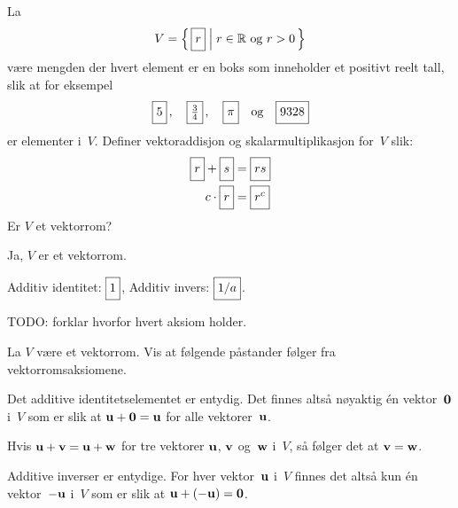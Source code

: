 \begin{oppgave}
La
\[
V = \left\{\, \boks{r} \;\middle|\; \text{$r \in \R$ og $r > 0$} \,\right\}
\]
være mengden der hvert element er en boks som inneholder et positivt reelt tall,
slik at for eksempel
\[
\boks{5}\,,\quad
\boks{\frac{3}{4}}\,,\quad
\boks{\pi}\quad\text{og}\quad
\boks{9328}
\]
er elementer i~$V$.  Definer vektoraddisjon og skalarmultiplikasjon
for~$V$ slik:
\begin{align*}
\boks{r} + \boks{s} &= \boks{rs} \\
c \cdot \boks{r}    &= \boks{r^c}
\end{align*}
Er $V$ et vektorrom?
\end{oppgave}

\begin{losning}
Ja, $V$ er et vektorrom.

Additiv identitet: $\boks{1}$, Additiv invers: $\boks{1/a}$.

TODO: forklar hvorfor hvert aksiom holder.
\end{losning}





\begin{oppgave}
La $V$ være et vektorrom.
Vis at følgende påstander følger fra vektorromsaksiomene.
\begin{punkt}
Det additive identitetselementet er entydig.  Det finnes altså
nøyaktig én vektor~$\mathbf{0}$ i~$V$ som er slik at
$\mathbf{u} + \mathbf{0} = \mathbf{u}$ for alle vektorer~$\mathbf{u}$.
\end{punkt}
\begin{punkt}
Hvis $\mathbf{u} + \mathbf{v} = \mathbf{u} + \mathbf{w}$ for tre vektorer $\mathbf{u}$, $\mathbf{v}$
og~$\mathbf{w}$ i~$V$, så følger det at $\mathbf{v} = \mathbf{w}$.
\end{punkt}
\begin{punkt}
Additive inverser er entydige.  For hver vektor~$\mathbf{u}$ i~$V$ finnes
det altså kun én vektor~$-\mathbf{u}$ i~$V$ som er slik at
$\mathbf{u} + (-\mathbf{u}) = \mathbf{0}$.
\end{punkt}
\end{oppgave}

